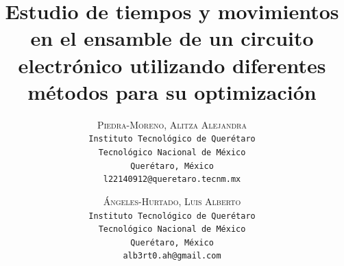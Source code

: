 \lfoot{ \thepage}

\setlength{\droptitle}{-5\baselineskip} %
\title{\textbf{Estudio de tiempos y movimientos en el ensamble de un circuito electrónico utilizando diferentes métodos para su optimización }} %

 \author{ 
 \textsc{Piedra-Moreno, Alitza Alejandra}\\ 
 \texttt{ Instituto Tecnológico de Querétaro } \\ 
 \texttt{ Tecnológico Nacional de México } \\ 
 \texttt{Querétaro, México}\\ 
 \texttt{l22140912@queretaro.tecnm.mx} 
 \and 
 \textsc{Ángeles-Hurtado, Luis Alberto}\\ 
 \texttt{ Instituto Tecnológico de Querétaro } \\ 
 \texttt{ Tecnológico Nacional de México } \\ 
 \texttt{Querétaro, México}\\ 
 \texttt{alb3rt0.ah@gmail.com} 
}



% 

\maketitle
\thispagestyle{fancy}

